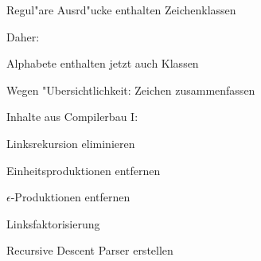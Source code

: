{
\begin{itemgroup}{}
   \item Regul"are Ausrd"ucke enthalten Zeichenklassen
   
   \item Daher:
   \begin{itemgroup}{}
      \item Alphabete enthalten jetzt auch Klassen
   \end{itemgroup}
   
   \item Wegen "Ubersichtlichkeit: Zeichen zusammenfassen
\end{itemgroup}
\vfill{}
}

{
\begin{itemgroup}{}
   \item Inhalte aus Compilerbau I:
   \begin{itemgroup}{}
      \item Linksrekursion eliminieren
      
      \item Einheitsproduktionen entfernen
      
      \item $\epsilon$-Produktionen entfernen
      
      \item Linksfaktorisierung
      
      \item Recursive Descent Parser erstellen
   \end{itemgroup}
\end{itemgroup}
\vfill{}
}
